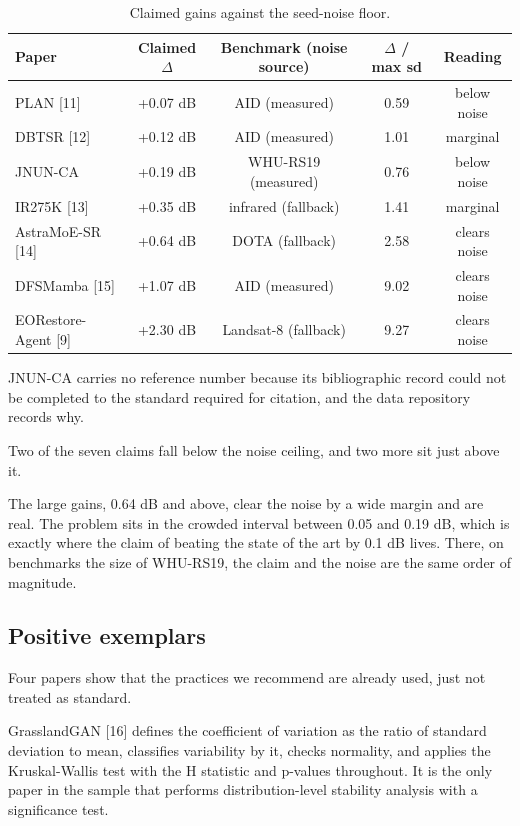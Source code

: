 \documentclass[journal,twoside,10pt]{IEEEtran}
\newlength{\tblavail}
\begin{document}
\begin{table}[!t]
\caption{Claimed gains against the seed-noise floor.}
\label{tab:VIII}
\centering
\small
\setlength{\tabcolsep}{3pt}
\setlength{\tblavail}{\dimexpr\textwidth-10\tabcolsep\relax}
\begin{tabular}{lcccc}
\hline
Paper & Claimed $\Delta$ & Benchmark (noise source) & $\Delta$ / max sd & Reading \\
\hline
PLAN [11] & +0.07 dB & AID (measured) & 0.59 & below noise \\
DBTSR [12] & +0.12 dB & AID (measured) & 1.01 & marginal \\
JNUN-CA & +0.19 dB & WHU-RS19 (measured) & 0.76 & below noise \\
IR275K [13] & +0.35 dB & infrared (fallback) & 1.41 & marginal \\
AstraMoE-SR [14] & +0.64 dB & DOTA (fallback) & 2.58 & clears noise \\
DFSMamba [15] & +1.07 dB & AID (measured) & 9.02 & clears noise \\
EORestore-Agent [9] & +2.30 dB & Landsat-8 (fallback) & 9.27 & clears noise \\
\hline
\end{tabular}
\end{table}

JNUN-CA carries no reference number because its bibliographic record could not be completed to the standard required for citation, and the data repository records why.

Two of the seven claims fall below the noise ceiling, and two more sit just above it.

The large gains, 0.64 dB and above, clear the noise by a wide margin and are real. The problem sits in the crowded interval between 0.05 and 0.19 dB, which is exactly where the claim of beating the state of the art by 0.1 dB lives. There, on benchmarks the size of WHU-RS19, the claim and the noise are the same order of magnitude.

\subsection{Positive exemplars}


Four papers show that the practices we recommend are already used, just not treated as standard.

GrasslandGAN [16] defines the coefficient of variation as the ratio of standard deviation to mean, classifies variability by it, checks normality, and applies the Kruskal-Wallis test with the H statistic and p-values throughout. It is the only paper in the sample that performs distribution-level stability analysis with a significance test.
\end{document}
